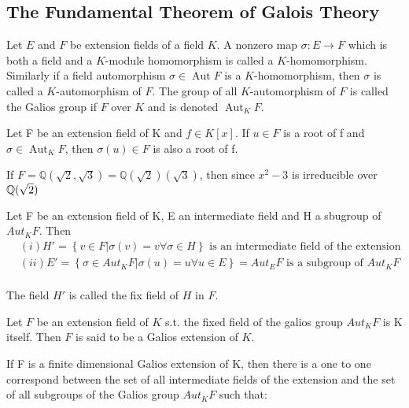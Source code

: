 \subsection{The Fundamental Theorem of Galois Theory}
\begin{definition}
Let $E$ and $F$ be extension fields of a field $K$. A nonzero map $\sigma:E\longrightarrow F$ which is both a field and a $K$-module homomorphism is called a $K$-homomorphism. Similarly if a field automorphism $\sigma\in \operatorname{Aut}F$ is a $K$-homomorphism, then $\sigma$ is called a $K$-automorphism of $F$. The group of all $K$-automorphism of $F$ is called the Galios group if $F$ over $K$ and is denoted $\operatorname{Aut}_KF$.
\end{definition}
\begin{theorem}
Let F be an extension field of K and $f\in K[x]$. If $u\in F$ is a root of f and $\sigma\in\operatorname{Aut}_KF$, then $\sigma(u)\in F$ is also a root of f.
\end{theorem}

\begin{example}
If $F=\mathbb{Q}(\sqrt2,\sqrt3)=\mathbb{Q}(\sqrt2)(\sqrt3)$, then since $x^2-3$ is irreducible over $\mathbb{Q}(\sqrt{2})$

\end{example}

\begin{theorem}
Let F be an extension field of K, E an intermediate field and H a sbugroup of $Aut_KF$. Then
\begin{align*}
&(i)H'=\left\{ v\in F|\sigma(v)=v \forall \sigma\in H \right\}\text{ is an intermediate field of the extension}\\
&(ii)E'=\left\{ \sigma\in Aut_KF|\sigma(u)=u \forall u\in E \right\}=Aut_EF\text{ is a subgroup of }Aut_KF\\
\end{align*}

\end{theorem}
The field $H'$ is called the fix field of $H$ in $F$.
\begin{definition}
Let $F$ be an extension field of $K$ s.t. the fixed field of the galios group  $Aut_KF$ is K itself. Then $F$ is said to be a Galios extension of $K$.
\end{definition}

\begin{theorem}
If F is a finite dimensional Galios extension of K, then there is a one to one correspond between the set of all intermediate fields of the extension and the set of all subgroups of the Galios group $Aut_KF$ such that:
\end{theorem}


